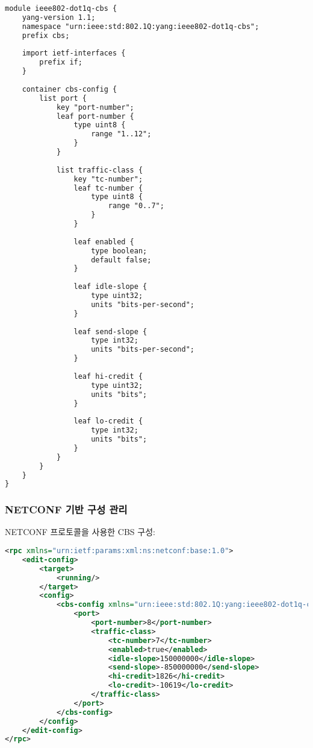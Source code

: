 \documentclass[twocolumn,10pt]{article}
\begin{document}
\begin{lstlisting}[language=XML, caption=CBS YANG 모델]
module ieee802-dot1q-cbs {
    yang-version 1.1;
    namespace "urn:ieee:std:802.1Q:yang:ieee802-dot1q-cbs";
    prefix cbs;
    
    import ietf-interfaces {
        prefix if;
    }
    
    container cbs-config {
        list port {
            key "port-number";
            leaf port-number {
                type uint8 {
                    range "1..12";
                }
            }
            
            list traffic-class {
                key "tc-number";
                leaf tc-number {
                    type uint8 {
                        range "0..7";
                    }
                }
                
                leaf enabled {
                    type boolean;
                    default false;
                }
                
                leaf idle-slope {
                    type uint32;
                    units "bits-per-second";
                }
                
                leaf send-slope {
                    type int32;
                    units "bits-per-second";
                }
                
                leaf hi-credit {
                    type uint32;
                    units "bits";
                }
                
                leaf lo-credit {
                    type int32;
                    units "bits";
                }
            }
        }
    }
}
\end{lstlisting}

\subsubsection{NETCONF 기반 구성 관리}

NETCONF 프로토콜을 사용한 CBS 구성:

\begin{lstlisting}[language=XML, caption=NETCONF CBS 구성 예제]
<rpc xmlns="urn:ietf:params:xml:ns:netconf:base:1.0">
    <edit-config>
        <target>
            <running/>
        </target>
        <config>
            <cbs-config xmlns="urn:ieee:std:802.1Q:yang:ieee802-dot1q-cbs">
                <port>
                    <port-number>8</port-number>
                    <traffic-class>
                        <tc-number>7</tc-number>
                        <enabled>true</enabled>
                        <idle-slope>150000000</idle-slope>
                        <send-slope>-850000000</send-slope>
                        <hi-credit>1826</hi-credit>
                        <lo-credit>-10619</lo-credit>
                    </traffic-class>
                </port>
            </cbs-config>
        </config>
    </edit-config>
</rpc>
\end{lstlisting}
\end{document}
